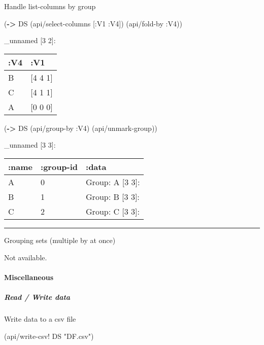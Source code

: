 \documentclass[]{article}
\newenvironment{Shaded}{\begin{snugshade}}{\end{snugshade}}
\newcommand{\KeywordTok}[1]{\textcolor[rgb]{0.13,0.29,0.53}{\textbf{#1}}}
\newcommand{\StringTok}[1]{\textcolor[rgb]{0.31,0.60,0.02}{#1}}
\newcommand{\AttributeTok}[1]{\textcolor[rgb]{0.77,0.63,0.00}{#1}}
\newcommand{\NormalTok}[1]{#1}
\let\oldparagraph\paragraph
\renewcommand{\paragraph}[1]{\oldparagraph{#1}\mbox{}}
\let\oldsubparagraph\subparagraph
\renewcommand{\subparagraph}[1]{\oldsubparagraph{#1}\mbox{}}
\begin{document}
Handle list-columns by group

\begin{Shaded}
\begin{Highlighting}[]
\NormalTok{(}\KeywordTok{->}\NormalTok{ DS}
\NormalTok{    (api/select-columns [}\AttributeTok{:V1} \AttributeTok{:V4}\NormalTok{])}
\NormalTok{    (api/fold-by }\AttributeTok{:V4}\NormalTok{))}
\end{Highlighting}
\end{Shaded}

\_unnamed {[}3 2{]}:

\begin{longtable}[]{@{}ll@{}}
\toprule
:V4 & :V1\tabularnewline
\midrule
\endhead
B & {[}4 4 1{]}\tabularnewline
C & {[}4 1 1{]}\tabularnewline
A & {[}0 0 0{]}\tabularnewline
\bottomrule
\end{longtable}

\begin{Shaded}
\begin{Highlighting}[]
\NormalTok{(}\KeywordTok{->}\NormalTok{ DS    }
\NormalTok{    (api/group-by }\AttributeTok{:V4}\NormalTok{)}
\NormalTok{    (api/unmark-group))}
\end{Highlighting}
\end{Shaded}

\_unnamed {[}3 3{]}:

\begin{longtable}[]{@{}lll@{}}
\toprule
:name & :group-id & :data\tabularnewline
\midrule
\endhead
A & 0 & Group: A {[}3 3{]}:\tabularnewline
B & 1 & Group: B {[}3 3{]}:\tabularnewline
C & 2 & Group: C {[}3 3{]}:\tabularnewline
\bottomrule
\end{longtable}

\begin{center}\rule{0.5\linewidth}{0.5pt}\end{center}

Grouping sets (multiple by at once)

Not available.

\paragraph{Miscellaneous}\label{miscellaneous}

\subparagraph{Read / Write data}\label{read-write-data}

Write data to a csv file

\begin{Shaded}
\begin{Highlighting}[]
\NormalTok{(api/write-csv! DS }\StringTok{"DF.csv"}\NormalTok{)}
\end{Highlighting}
\end{Shaded}
\end{document}
